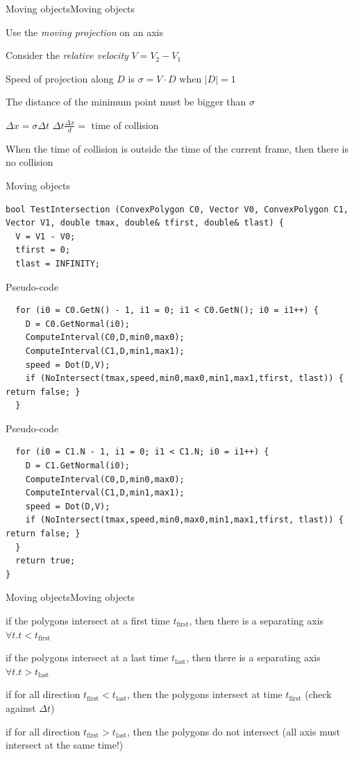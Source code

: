 \documentclass{beamer}
\begin{document}
\begin{slide}{Moving objects}{Moving objects}{
\item Use the \textit{moving projection} on an axis
\item Consider the \textit{relative velocity} $V = V_2 - V_1$
\item Speed of projection along $D$ is $\sigma = V \cdot D$ when $|D| = 1$
\item The distance of the minimum point must be bigger than $\sigma$
\item $\Delta x = \sigma \Delta t$ $\Delta t \frac{\Delta x}{d} = $ time of collision
\item When the time of collision is outside the time of the current frame, then there is no collision
}\end{slide}

\begin{frame}[fragile]{Moving objects}
\begin{lstlisting}
bool TestIntersection (ConvexPolygon C0, Vector V0, ConvexPolygon C1, Vector V1, double tmax, double& tfirst, double& tlast) { 
  V = V1 - V0;
  tfirst = 0; 
  tlast = INFINITY;
\end{lstlisting}
\end{frame}
\begin{frame}[fragile]{Pseudo-code}
\begin{lstlisting}
  for (i0 = C0.GetN() - 1, i1 = 0; i1 < C0.GetN(); i0 = i1++) { 
    D = C0.GetNormal(i0); 
    ComputeInterval(C0,D,min0,max0);
    ComputeInterval(C1,D,min1,max1); 
    speed = Dot(D,V); 
    if (NoIntersect(tmax,speed,min0,max0,min1,max1,tfirst, tlast)) { return false; }
  }
\end{lstlisting}
\end{frame}
\begin{frame}[fragile]{Pseudo-code}
\begin{lstlisting}  
  for (i0 = C1.N - 1, i1 = 0; i1 < C1.N; i0 = i1++) { 
    D = C1.GetNormal(i0); 
    ComputeInterval(C0,D,min0,max0); 
    ComputeInterval(C1,D,min1,max1); 
    speed = Dot(D,V); 
    if (NoIntersect(tmax,speed,min0,max0,min1,max1,tfirst, tlast)) { return false; } 
  } 
  return true;
}
\end{lstlisting}
\end{frame}

\begin{slide}{Moving objects}{Moving objects}{
\item if the polygons intersect at a first time $t_{\text{first}}$, then there is a separating axis $\forall t. t < t_{\text{first}}$
\item if the polygons intersect at a last time $t_{\text{last}}$, then there is a separating axis $\forall t. t > t_{\text{last}}$
\item if for all direction $t_{\text{first}} < t_{\text{last}}$, then the polygons intersect at time $t_{\text{first}}$ (check against $\Delta t$)
\item if for all direction $t_{\text{first}} > t_{\text{last}}$, then the polygons do not intersect (all axis must intersect at the same time!)
}\end{slide}
\end{document}
